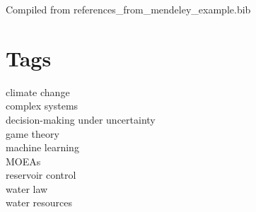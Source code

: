 \documentclass[11pt]{article}
\begin{document}
 
\maketitle 

\noindent Compiled from references\_from\_mendeley\_example.bib 

\section{Tags} 
\noindent climate change\\
\noindent complex systems\\
\noindent decision-making under uncertainty\\
\noindent game theory\\
\noindent machine learning\\
\noindent MOEAs\\
\noindent reservoir control\\
\noindent water law\\
\noindent water resources\\
\medskip
\end{document}
